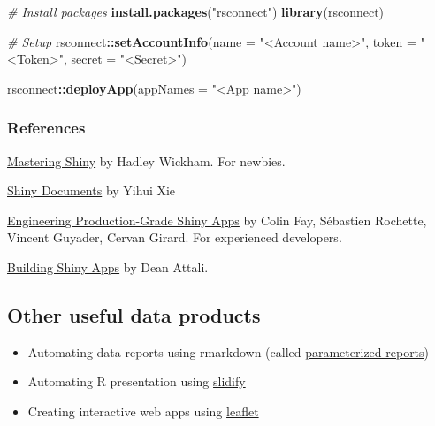 \documentclass[
]{book}
\newenvironment{Shaded}{\begin{snugshade}}{\end{snugshade}}
\newcommand{\CommentTok}[1]{\textcolor[rgb]{0.56,0.35,0.01}{\textit{#1}}}
\newcommand{\DataTypeTok}[1]{\textcolor[rgb]{0.13,0.29,0.53}{#1}}
\newcommand{\KeywordTok}[1]{\textcolor[rgb]{0.13,0.29,0.53}{\textbf{#1}}}
\newcommand{\NormalTok}[1]{#1}
\newcommand{\OperatorTok}[1]{\textcolor[rgb]{0.81,0.36,0.00}{\textbf{#1}}}
\newcommand{\StringTok}[1]{\textcolor[rgb]{0.31,0.60,0.02}{#1}}
\providecommand{\tightlist}{%
  \setlength{\itemsep}{0pt}\setlength{\parskip}{0pt}}
\begin{document}
\begin{Shaded}
\begin{Highlighting}[]
\CommentTok{\# Install packages }
\KeywordTok{install.packages}\NormalTok{(}\StringTok{"rsconnect"}\NormalTok{)}
\KeywordTok{library}\NormalTok{(rsconnect)}

\CommentTok{\# Setup }
\NormalTok{rsconnect}\OperatorTok{::}\KeywordTok{setAccountInfo}\NormalTok{(}\DataTypeTok{name =} \StringTok{"\textless{}Account name\textgreater{}"}\NormalTok{, }
                          \DataTypeTok{token =} \StringTok{"\textless{}Token\textgreater{}"}\NormalTok{,}
                          \DataTypeTok{secret =} \StringTok{"\textless{}Secret\textgreater{}"}\NormalTok{)}

\NormalTok{rsconnect}\OperatorTok{::}\KeywordTok{deployApp}\NormalTok{(}\DataTypeTok{appNames =} \StringTok{"\textless{}App name\textgreater{}"}\NormalTok{)}
\end{Highlighting}
\end{Shaded}

\hypertarget{references-1}{%
\subsubsection{References}\label{references-1}}

\href{https://mastering-shiny.org/}{Mastering Shiny} by Hadley Wickham. For newbies.

\href{https://bookdown.org/yihui/rmarkdown/shiny-documents.html}{Shiny Documents} by Yihui Xie

\href{https://engineering-shiny.org/}{Engineering Production-Grade Shiny Apps} by Colin Fay, Sébastien Rochette, Vincent Guyader, Cervan Girard. For experienced developers.

\href{https://stat545.com/shiny-tutorial.html}{Building Shiny Apps} by Dean Attali.

\hypertarget{other-useful-data-products}{%
\subsection{Other useful data products}\label{other-useful-data-products}}

\begin{itemize}
\tightlist
\item
  Automating data reports using rmarkdown (called \href{https://rmarkdown.rstudio.com/developer_parameterized_reports.html\%23parameter_types\%2F}{parameterized reports})
\item
  Automating R presentation using \href{http://slidify.org/index.html}{slidify}
\item
  Creating interactive web apps using \href{https://rstudio.github.io/leaflet/}{leaflet}
\end{itemize}
\end{document}
